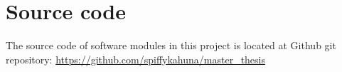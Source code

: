 
\section{Source code}
\label{sec:source_code}

The source code of software modules in this project is located at Github git repository: \newline
\large\url{https://github.com/spiffykahuna/master_thesis}
